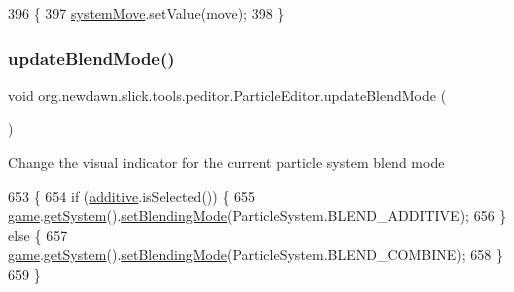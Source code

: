 \begin{DoxyCode}
396                                         \{
397         \mbox{\hyperlink{classorg_1_1newdawn_1_1slick_1_1tools_1_1peditor_1_1_particle_editor_a59b07ee0b275f384b9dd38e6323930da}{systemMove}}.setValue(move);
398     \}
\end{DoxyCode}
\mbox{\label{classorg_1_1newdawn_1_1slick_1_1tools_1_1peditor_1_1_particle_editor_a052734751c1a77ad1c94dcd161fff993}} 
\subsubsection{\texorpdfstring{update\+Blend\+Mode()}{updateBlendMode()}}
{\footnotesize\ttfamily void org.\+newdawn.\+slick.\+tools.\+peditor.\+Particle\+Editor.\+update\+Blend\+Mode (\begin{DoxyParamCaption}{ }\end{DoxyParamCaption})\hspace{0.3cm}{\ttfamily [inline]}}

Change the visual indicator for the current particle system blend mode 
\begin{DoxyCode}
653                                   \{
654         \textcolor{keywordflow}{if} (\mbox{\hyperlink{classorg_1_1newdawn_1_1slick_1_1tools_1_1peditor_1_1_particle_editor_a0d9d0e20f004cbd5e65f148b99b63093}{additive}}.isSelected()) \{
655             \mbox{\hyperlink{classorg_1_1newdawn_1_1slick_1_1tools_1_1peditor_1_1_particle_editor_a30ffb1c9b34c421c0ef6a28efbaaa450}{game}}.\mbox{\hyperlink{classorg_1_1newdawn_1_1slick_1_1tools_1_1peditor_1_1_particle_game_a863b0f3f5c65d561161edf6bfc6c1d8f}{getSystem}}().\mbox{\hyperlink{classorg_1_1newdawn_1_1slick_1_1particles_1_1_particle_system_a430d7e9a09b132694497f4e6075cd58c}{setBlendingMode}}(ParticleSystem.BLEND\_ADDITIVE);
656         \} \textcolor{keywordflow}{else} \{
657             \mbox{\hyperlink{classorg_1_1newdawn_1_1slick_1_1tools_1_1peditor_1_1_particle_editor_a30ffb1c9b34c421c0ef6a28efbaaa450}{game}}.\mbox{\hyperlink{classorg_1_1newdawn_1_1slick_1_1tools_1_1peditor_1_1_particle_game_a863b0f3f5c65d561161edf6bfc6c1d8f}{getSystem}}().\mbox{\hyperlink{classorg_1_1newdawn_1_1slick_1_1particles_1_1_particle_system_a430d7e9a09b132694497f4e6075cd58c}{setBlendingMode}}(ParticleSystem.BLEND\_COMBINE);
658         \}
659     \}
\end{DoxyCode}


